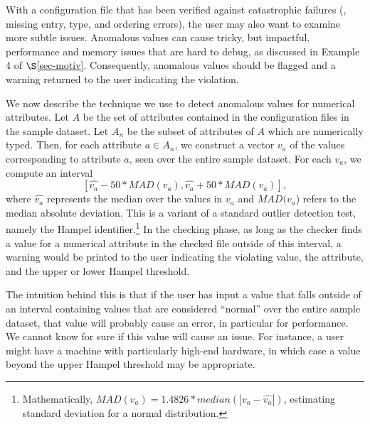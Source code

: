 With a configuration file that has been verified against catastrophic
failures (\eg, missing entry, type, and ordering errors), 
the user may also want to examine more subtle issues.
Anomalous values can cause tricky, but impactful, performance and memory
issues that are hard to debug, as discussed in Example 4 of 
$\S$\ref{sec-motiv}. 
Consequently, anomalous values should be flagged and a warning returned
to the user indicating the violation.

We now describe the technique we use to detect anomalous values for 
numerical attributes. Let $A$ be the set of attributes contained in the 
configuration files in the sample dataset. 
Let $A_n$ be the subset of attributes of $A$ which are numerically typed. 
Then, for each attribute $a \in A_n$, we construct a vector $v_a$ of the 
values corresponding to attribute $a$, seen over the entire sample dataset.
For each $v_a$, we compute 
an interval  $$[\hat{v_a} - 50*MAD(v_a), \hat{v_a} + 50*MAD(v_a)],$$ 
where $\hat{v_a}$ represents the median over the values 
in $v_a$ and $MAD(v_a$) refers to the 
median absolute deviation. 
This is a variant of a standard outlier detection test, namely the Hampel identifier.\footnote{Mathematically, $MAD(v_a) = 1.4826* median(|v_a - \hat{v_a}|)$, estimating standard deviation 
for a normal distribution.} 
In the checking phase, as long as the checker finds a value for a numerical 
attribute in the checked file outside of this interval, 
a warning would be printed to the user indicating the violating value, 
the attribute, and the upper or lower Hampel threshold. 

The intuition behind this is that if the user has input a value 
that falls outside of an interval containing values that are considered 
``normal'' over the entire sample dataset, 
that value will probably cause an error, in particular for performance. 
We cannot know for sure if this value will cause an issue. 
For instance, a user might have a machine with 
particularly high-end hardware, 
in which case a value beyond the upper Hampel threshold may be appropriate. 
